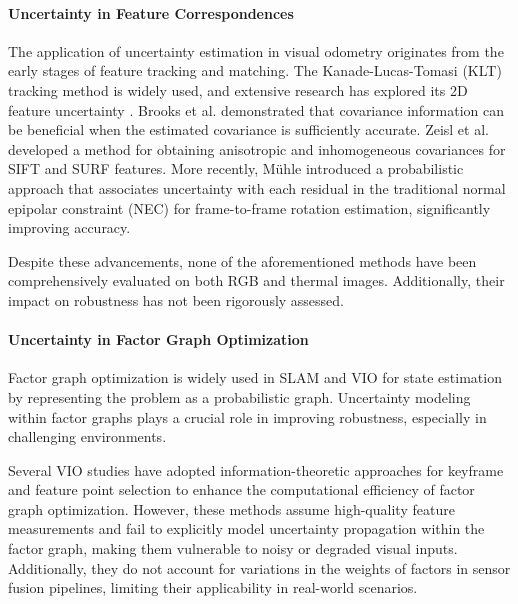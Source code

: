 \paragraph{\textbf{Uncertainty in Feature Correspondences}}

The application of uncertainty estimation in visual odometry originates from the early stages of feature tracking and matching. The Kanade-Lucas-Tomasi (KLT) tracking method \cite{tomasi1991detection} is widely used, and extensive research has explored its 2D feature uncertainty \cite{sheorey2015uncertainty, steele2005feature}. Brooks et al. \cite{brooks2001value} demonstrated that covariance information can be beneficial when the estimated covariance is sufficiently accurate. Zeisl et al. \cite{lowe2004distinctive} developed a method for obtaining anisotropic and inhomogeneous covariances for SIFT and SURF \cite{bay2006surf} features. More recently, Mühle \cite{muhle2022probabilistic} introduced a probabilistic approach that associates uncertainty with each residual in the traditional normal epipolar constraint (NEC) for frame-to-frame rotation estimation, significantly improving accuracy.

Despite these advancements, none of the aforementioned methods have been comprehensively evaluated on both RGB and thermal images. Additionally, their impact on robustness has not been rigorously assessed.

\paragraph{\textbf{Uncertainty in Factor Graph Optimization}}
Factor graph optimization \cite{dellaert2017factor} is widely used in SLAM and VIO for state estimation by representing the problem as a probabilistic graph. Uncertainty modeling within factor graphs plays a crucial role in improving robustness, especially in challenging environments. 

Several VIO studies \cite{cleveston2021ram, stutts2023lightweight, fontan2020information, chen2023adaptslam} have adopted information-theoretic approaches for keyframe and feature point selection to enhance the computational efficiency of factor graph optimization. However, these methods assume high-quality feature measurements and fail to explicitly model uncertainty propagation within the factor graph, making them vulnerable to noisy or degraded visual inputs. Additionally, they do not account for variations in the weights of factors in sensor fusion pipelines, limiting their applicability in real-world scenarios.


